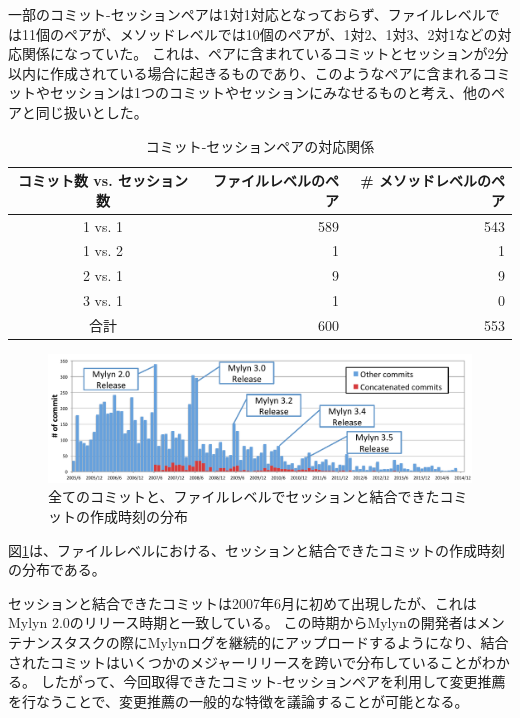 \documentclass[a4paper]{jsbook}
\begin{document}
一部のコミット-セッションペアは1対1対応となっておらず、ファイルレベルでは11個のペアが、メソッドレベルでは10個のペアが、1対2、1対3、2対1などの対応関係になっていた。
これは、ペアに含まれているコミットとセッションが2分以内に作成されている場合に起きるものであり、このようなペアに含まれるコミットやセッションは1つのコミットやセッションにみなせるものと考え、他のペアと同じ扱いとした。
\begin{table}[tb]
  \begin{center}
    \caption{コミット-セッションペアの対応関係}
\label{squash}
\begin{tabular}{c|rr}
  \hline
  コミット数 vs. セッション数 & ファイルレベルのペア&\# メソッドレベルのペア\\
    \hline
  1 vs. 1 & 589 & 543\\
  1 vs. 2 & 1 & 1\\
  2 vs. 1 & 9 & 9\\
  3 vs. 1 & 1 & 0\\
\hline
  合計 & 600& 553\\
  \hline
\end{tabular}
  \end{center}
\end{table}

\begin{figure}[tb]
  \centering
  \includegraphics[width = 0.9\linewidth]{resource/commit_distribution.pdf}
  \caption{全てのコミットと、ファイルレベルでセッションと結合できたコミットの作成時刻の分布}
  \label{commit_distribution}
\end{figure}
図\ref{commit_distribution}は、ファイルレベルにおける、セッションと結合できたコミットの作成時刻の分布である。

セッションと結合できたコミットは2007年6月に初めて出現したが、これはMylyn 2.0のリリース時期と一致している。
この時期からMylynの開発者はメンテナンスタスクの際にMylynログを継続的にアップロードするようになり、結合されたコミットはいくつかのメジャーリリースを跨いで分布していることがわかる。
したがって、今回取得できたコミット-セッションペアを利用して変更推薦を行なうことで、変更推薦の一般的な特徴を議論することが可能となる。
\end{document}
